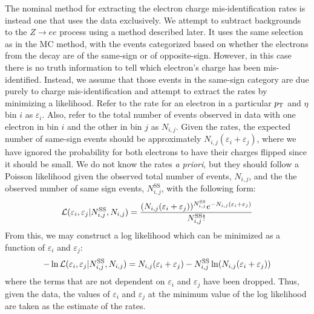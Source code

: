 The nominal method for extracting the electron charge mis-identification
rates is instead one that uses the data exclusively. 
We attempt to subtract backgrounds to the $Z\rightarrow ee$
process using a method described later.
It uses the same selection as in the MC method, with the events
categorized based on whether the electrons from the \z
decay are of the same-sign or of opposite-sign.
However, in this case
there is no truth information to tell which electron's charge
has been mis-identified. Instead, we assume that those events in
the same-sign category are due purely to charge mis-identification
and attempt to extract the rates by minimizing a likelihood.
Refer to the rate for an electron in a 
particular $p_{\mathrm{T}}$ and $\eta$ bin $i$ as $\varepsilon_i$.
Also, refer to the total number of events observed in data with one electron
in bin $i$ and the other in bin $j$ as $N_{i,j}$.
Given the rates, the expected number of same-sign events
should be approximately $N_{i,j}(\varepsilon_i + \varepsilon_j)$,
where we have ignored the probability for both electrons to have their
charges flipped since it should be small. We do
not know the rates \emph{a priori}, but they should follow 
a Poisson likelihood given the observed total number of events,
$N_{i,j}$, and the the observed number of same sign events,
$N_{i,j}^{\textrm{SS}}$, with the following form:
\begin{equation}
\mathcal{L}( \varepsilon_i,\varepsilon_j | N_{i,j}^{\textrm{SS}},N_{i,j})
=
\frac{(N_{i,j}(\varepsilon_i+\varepsilon_j))^{N^{\textrm{SS}}_{i,j}} e^{-N_{i,j}(\varepsilon_i+\varepsilon_j)}}{N^{\textrm{SS}}_{i,j}!}
\end{equation}
From this, we may construct a log likelihood which can be minimized
as a function of $\varepsilon_i$ and $\varepsilon_j$:
\begin{equation}
-\ln \mathcal{L}( \varepsilon_i,\varepsilon_j | N_{i,j}^{\textrm{SS}},N_{i,j}) = 
N_{i,j}(\varepsilon_i+\varepsilon_j)
- N^{\textrm{SS}}_{i,j} \ln(N_{i,j}(\varepsilon_i+\varepsilon_j))
\end{equation}
where the terms that are not dependent on $\varepsilon_i$
and $\varepsilon_j$ have been dropped.
Thus, given the data, the values of $\varepsilon_i$ and $\varepsilon_j$
at the minimum value of the log likelihood are taken as the estimate
of the rates.

